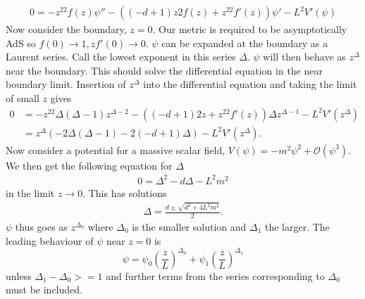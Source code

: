 \documentclass[12pt]{report}
\begin{document}
\begin{appendices}
\begin{equation}
\begin{split}
0=-z^22f(z)\psi''-\left((-d+1)z2f(z) + z^22f'(z)\right)\psi' -L^2V'(\psi)
\end{split}
\end{equation}
Now consider the boundary, $z=0$. Our metric is required to be asymptotically AdS so $f(0)\rightarrow1, zf'(0)\rightarrow0$. $\psi$ can be expanded at the boundary as a Laurent series. Call the lowest exponent in this series $\Delta$. $\psi$ will then behave as $z^\Delta$ near the boundary. This should solve the differential equation in the near boundary limit. Insertion of $z^\Delta$ into the differential equation and taking the limit of small $z$ gives
\begin{equation}
\begin{split}
0&=-z^22\Delta(\Delta-1)z^{\Delta-2}-\left((-d+1)2z + z^22f'(z)\right)\Delta z^{\Delta-1} -L^2V'(z^{\Delta})\\
&=z^{\Delta}\left(-2\Delta(\Delta-1)-2(-d+1)\Delta\right)-L^2V'(z^{\Delta}).
\end{split}
\end{equation}
Now consider a potential for a massive scalar field, $V(\psi)=-m^2\psi^2+\mathcal{O}(\psi^3)$. We then get the following equation for $\Delta$
\begin{equation}
\begin{split}
0=\Delta^2-d\Delta-L^2m^2
\end{split}
\end{equation}
in the limit $z\rightarrow0$. This has solutions
\begin{equation}
\begin{split}
\Delta=\frac{d\pm\sqrt{d^2+4L^2m^2}}{2}.
\end{split}
\end{equation}
$\psi$ thus goes as $z^{\Delta_0}$ where $\Delta_0$ is the smaller solution and $\Delta_1$ the larger. The leading behaviour of $\psi$ near $z=0$ is
\begin{equation}
 \psi=\psi_0\left(\frac{z}{L}\right)^{\Delta_0}+\psi_1\left(\frac{z}{L}\right)^{\Delta_1}
\end{equation}
unless $\Delta_1-\Delta_0>=1$ and further terms from the series corresponding to $\Delta_0$ must be included.\\


\end{appendices}
\end{document}
